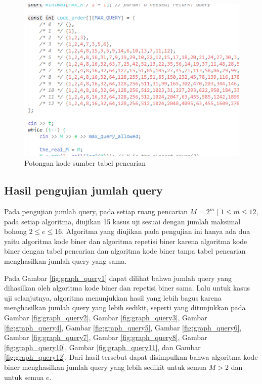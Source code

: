 \begin{figure}
\centering
\includegraphics[scale=0.80]{../img/kodingan.png}
\caption{Potongan kode sumber tabel pencarian}
\label{fig:sourcecode_lookup}
\end{figure}

\subsection{Hasil pengujian jumlah query}

Pada pengujian jumlah query, pada setiap ruang pencarian $M=2^m \mid 1 \leq m \leq 12$, pada setiap algoritma, diujikan 15 kasus uji sesuai dengan jumlah maksimal bohong $2 \leq e \leq 16$. Algoritma yang diujikan pada pengujian ini hanya ada dua yaitu algoritma kode biner dan algoritma repetisi biner karena algoritma kode biner dengan tabel pencarian dan algoritma kode biner tanpa tabel pencarian menghasilkan jumlah query yang sama.

Pada Gambar \ref{fig:graph_query1} dapat dilihat bahwa jumlah query yang dihasilkan oleh algoritma kode biner dan repetisi biner sama. Lalu untuk kasus uji selanjutnya, algoritma menunjukkan hasil yang lebih bagus karena menghasilkan jumlah query yang lebih sedikit, seperti yang ditunjukkan pada Gambar \ref{fig:graph_query2}, Gambar \ref{fig:graph_query3}, Gambar \ref{fig:graph_query4}, Gambar \ref{fig:graph_query5}, Gambar \ref{fig:graph_query6}, Gambar \ref{fig:graph_query7}, Gambar \ref{fig:graph_query8}, Gambar \ref{fig:graph_query10}, Gambar \ref{fig:graph_query11}, dan Gambar \ref{fig:graph_query12}. Dari hasil tersebut dapat disimpulkan bahwa algoritma kode biner menghasilkan jumlah query yang lebih sedikit untuk semua $M > 2$ dan untuk semua $e$.

